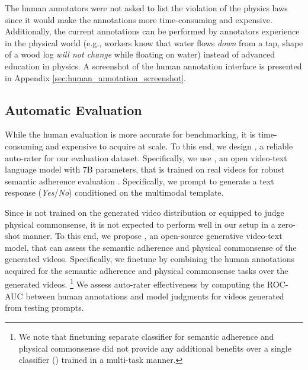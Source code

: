 The human annotators were not asked to list the violation of the physics laws since it would make the annotations more time-consuming and expensive. Additionally, the current annotations can be performed by annotators experience in the physical world (e.g., workers know that water flows \textit{down} from a tap, shape of a wood log \textit{will not change} while floating on water) instead of advanced education in physics. A screenshot of the human annotation interface is presented in Appendix \ref{sec:human_annotation_screenshot}. 



\subsection{Automatic Evaluation}
\label{sec:automatic_evaluation}

While the human evaluation is more accurate for benchmarking, it is time-consuming and expensive to acquire at scale.  To this end, we design \textbf{\model{}}, a reliable auto-rater for our evaluation dataset. 
Specifically, we use \videocon{}, an open video-text language model with $7$B parameters, that is trained on real videos for robust semantic adherence evaluation \cite{bansal2023videocon}. Specifically, we prompt \videocon{} to generate a text response (\textit{Yes}/\textit{No}) conditioned on the multimodal template.  

Since \videocon{} is not trained on the generated video distribution or equipped to judge physical commonsense, it is not expected to perform well in our setup in a zero-shot manner. To this end, we propose \model{}, an open-source generative video-text model, that can assess the semantic adherence and physical commonsense of the generated videos. Specifically, we finetune \videocon{} by combining the human annotations acquired for the semantic adherence and physical commonsense tasks over the generated videos. \footnote{We note that finetuning separate classifier for semantic adherence and physical commonsense did not provide any additional benefits over a single classifier (\model{}) trained in a multi-task manner.} We assess auto-rater effectiveness by computing the ROC-AUC between human annotations and model judgments for videos generated from testing prompts.

